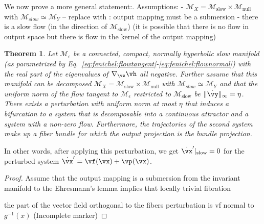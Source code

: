 \documentclass{article} %
\newcommand{\mpcomment}[1]{\textcolor{mpcolor}{(#1)}}
\newcounter{ct}
\newcommand{\manifold}{\mathcal{M}}
\newtheorem{theorem}{Theorem}
\theoremstyle{definition}
\theoremstyle{remark}
\begin{document}
We now prove a more general statement:.
Assumptions:
- \(\manifold_X= \manifold_{\text{slow}}\times \manifold_{\text{null}}\) with \(\manifold_{slow}\simeq \manifold_Y\) 
-- replace with : output mapping must be a submersion
- there is a slow flow (in the direction of \(\manifold_\text{slow}\)) (it is possible that there is no flow in output space but there is flow in the kernel of the output mapping)


\begin{theorem}
Let \(\manifold_\epsilon\) be a connected, compact, normally hyperbolic slow manifold  (as parametrized by Eq.~\eqref{eq:fenichel:flowtangent}-\eqref{eq:fenichel:flownormal}) with the real part of the eigenvalues of \(\nabla_\vz \vh\) all negative. %
Further assume that this manifold can be decomposed \(\manifold_X= \manifold_{\text{slow}}\times \manifold_{\text{null}}\) with \(\manifold_{slow}\simeq \manifold_Y\) and that 
 the uniform norm of the flow tangent to \(\manifold_\epsilon\) restricted to \(\manifold_{\text{slow}}\) be \(\|\dot \vy\|_\infty=\eta\).
There exists a perturbation with uniform norm at most \(\eta\) that induces a bifurcation to a system that is decomposable into a continuous attractor and a system with a non-zero flow. 
Furthermore, the trajectories of the second system make up a fiber bundle for which the output projection is the bundle projection.
\end{theorem}

In other words, after applying this perturbation, we get \(\dot \vx'|_\text{slow} = 0\) for the perturbed system \(\dot \vx' = \vf(\vx) + \vp(\vx)\).

\begin{proof}
Assume that the output mapping is a submersion from the invariant manifold to the 
Ehresmann's lemma implies that locally trivial fibration

the part of the vector field orthogonal to the fibers
perturbation is vf normal to \(g^{-1}(x)\)
\mpcomment{Incomplete marker}

\end{proof}
\end{document}
